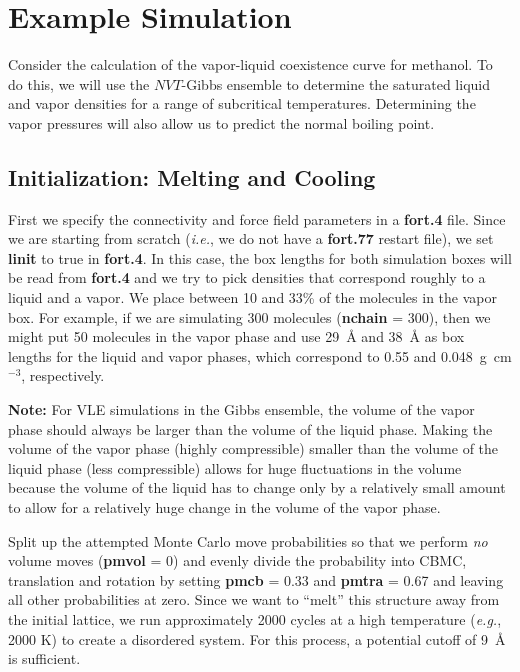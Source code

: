 \documentclass[12pt,letterpaper]{article}
\begin{document}
{{{{{{%
\section{Example Simulation} 

\noindent Consider the calculation of the vapor-liquid coexistence curve
for methanol.  To do this, we will use the $NVT$-Gibbs ensemble to
determine the saturated liquid and vapor densities for a range of
subcritical temperatures.  Determining the vapor pressures will also
allow us to predict the normal boiling point.

\subsection{Initialization: Melting and Cooling}

\noindent First we specify the connectivity and force field parameters
in a {\bf fort.4} file.  Since we are starting from scratch ({\it i.e.}, we do not have
a {\bf fort.77} restart file), we set {\bf linit} to true in {\bf fort.4}.  
In this case, the box lengths for both simulation boxes
will be read from {\bf fort.4} and we try to pick densities that
correspond roughly to a liquid and a vapor. We place between 10 and 33\%
of the molecules in the vapor box.  For example, if we are simulating 300 molecules
({\bf nchain} = 300), then we might put 50 molecules in the vapor phase and use 29~{\AA} 
and 38~{\AA} as box lengths for the liquid and vapor phases, which
correspond to 0.55 and 0.048~g~cm$^{-3}$, respectively.

{\bf Note:} For VLE simulations in the Gibbs ensemble, the volume of the vapor phase should always be larger than the volume of the liquid phase. Making the volume of the vapor phase (highly compressible) smaller than the volume of the liquid phase (less compressible) allows for huge fluctuations in the volume because the volume of the liquid has to change only by a relatively small amount to allow for a relatively huge change in the volume of the vapor phase.

\noindent Split up the attempted Monte Carlo move probabilities so that we
perform {\sl no} volume moves ({\bf pmvol} = 0) and evenly divide the
probability into CBMC, translation and rotation by setting {\bf pmcb}
= 0.33 and {\bf pmtra} = 0.67 and leaving all other probabilities at
zero.  Since we want to ``melt'' this structure away from the initial lattice,
we run approximately 2000 cycles at a high temperature ({\it e.g.}, 2000 K)
to create a disordered system.  For this process, a potential cutoff of 9~{\AA} is sufficient.  

}}}}}}
\end{document}

